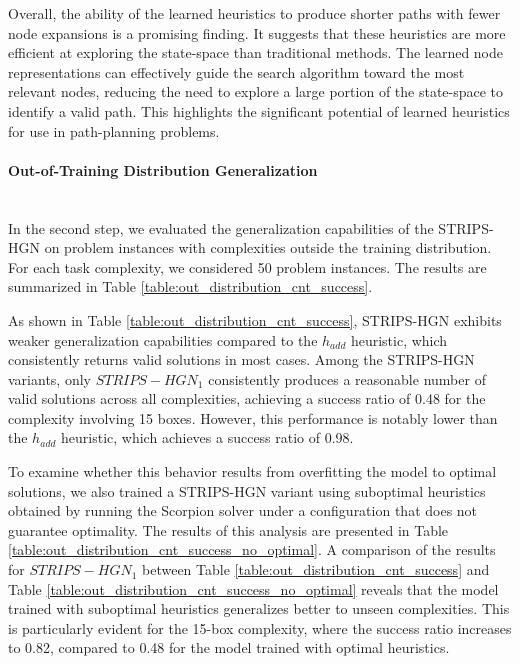 Overall, the ability of the learned heuristics to produce shorter paths with fewer node expansions is a promising finding. It suggests that these heuristics are more efficient at exploring the state-space than traditional methods. The learned node representations can effectively guide the search algorithm toward the most relevant nodes, reducing the need to explore a large portion of the state-space to identify a valid path. This highlights the significant potential of learned heuristics for use in path-planning problems.






\paragraph*{Out-of-Training Distribution Generalization} \mbox{}\\
In the second step, we evaluated the generalization capabilities of the STRIPS-HGN on problem instances with complexities outside the training distribution. For each task complexity, we considered 50 problem instances. The results are summarized in Table \ref{table:out_distribution_cnt_success}.



As shown in Table \ref{table:out_distribution_cnt_success}, STRIPS-HGN exhibits weaker generalization capabilities compared to the  $h_{add}$ heuristic, which consistently returns valid solutions in most cases. Among the STRIPS-HGN variants, only $ STRIPS-HGN_1 $ consistently produces a reasonable number of valid solutions across all complexities, achieving a success ratio of 0.48 for the complexity involving 15 boxes. However, this performance is notably lower than the $ h_{add} $ heuristic, which achieves a success ratio of 0.98.

To examine whether this behavior results from overfitting the model to optimal solutions, we also trained a STRIPS-HGN variant using suboptimal heuristics obtained by running the Scorpion solver under a configuration that does not guarantee optimality. The results of this analysis are presented in Table \ref{table:out_distribution_cnt_success_no_optimal}. A comparison of the results for $ STRIPS-HGN_1 $ between Table \ref{table:out_distribution_cnt_success} and Table \ref{table:out_distribution_cnt_success_no_optimal} reveals that the model trained with suboptimal heuristics generalizes better to unseen complexities. This is particularly evident for the 15-box complexity, where the success ratio increases to 0.82, compared to 0.48 for the model trained with optimal heuristics.

